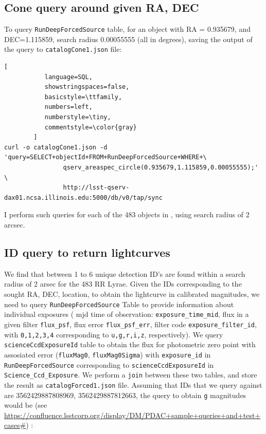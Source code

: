 \documentclass[fleqn,usenatbib]{mnras} %
\begin{document}
\subsection{Cone query around given RA, DEC}

To query \verb|RunDeepForcedSource| table, for an object with RA = 0.935679, and DEC=1.115859, search radius 0.00055555 (all in degrees), saving the output of the query to \verb|catalogCone1.json| file:

\begin{lstlisting}[
           language=SQL,
           showstringspaces=false,
           basicstyle=\ttfamily,
           numbers=left,
           numberstyle=\tiny,
           commentstyle=\color{gray}
        ]
curl -o catalogCone1.json -d 'query=SELECT+objectId+FROM+RunDeepForcedSource+WHERE+\
                qserv_areaspec_circle(0.935679,1.115859,0.00055555);' \
                http://lsst-qserv-dax01.ncsa.illinois.edu:5000/db/v0/tap/sync
\end{lstlisting}

I perform such queries for each of the 483 objects in \cite{sesar2010}, using search radius of 2 arcsec. 

\subsection{ID query to return lightcurves}
We find that between 1 to 6 unique detection ID's are found within a search radius of 2 arsec for the 483 RR Lyrae.  Given the IDs corresponding to the sought RA, DEC, location, to obtain the lightcurve in calibrated magnitudes, we need to query \verb|RunDeepForcedSource| Table to provide information about individual exposures ( mjd time of observation: \verb|exposure_time_mid|, flux in a given filter \verb|flux_psf|, flux error \verb|flux_psf_err|, filter code \verb|exposure_filter_id|, with  \verb|0,1,2,3,4| corresponding to  \verb|u,g,r,i,z|, respectively).  We query \verb|scienceCcdExposureId| table to obtain the flux for photometric zero point with assosiated error (\verb|fluxMag0|, \verb|fluxMag0Sigma|)  with  \verb|exposure_id| in \verb|RunDeepForcedSource| corresponding to \verb|scienceCcdExposureId| in \verb|Science_Ccd_Exposure|. We perform a \verb|join| between these two tables, and store the result as   \verb|catalogForced1.json| file. 
Assuming that IDs that we query against are 3562429887808969, 3562429887812663, the query to obtain \verb|g| magnitudes would be (see  \url{https://confluence.lsstcorp.org/display/DM/PDAC+sample+queries+and+test+cases#}) :
\end{document}
